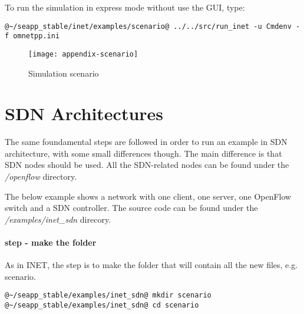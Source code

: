 To run the simulation in express mode without use the GUI, type:
\begin{lstlisting}[language={terminal}]
@~/seapp_stable/inet/examples/scenario@ ../../src/run_inet -u Cmdenv -f omnetpp.ini
\end{lstlisting}
%
\begin{landscape}
\begin{figure}[b]
\centering
\texttt{[image: appendix-scenario]}
\caption{Simulation scenario}
\label{img:appendix-scenario}
\end{figure}
\end{landscape}


\section{SDN Architectures}
The same foundamental steps are followed in order to run an example in SDN architecture, with some small differences though. The main difference is that SDN nodes should be used. All the SDN-related nodes can be found under the \emph{/openflow} directory.

The below example shows a network with one client, one server, one OpenFlow switch and a SDN controller. The source code can be found under the \emph{/examples/inet\_sdn} direcory.

\paragraph{ step - make the folder}
As in INET, the  step is to make the folder that will contain all the new files, e.g. scenario.
%
\begin{lstlisting}[language={terminal}]
@~/seapp_stable/examples/inet_sdn@ mkdir scenario
@~/seapp_stable/examples/inet_sdn@ cd scenario
\end{lstlisting}



